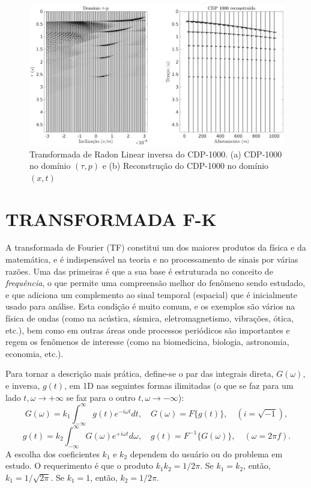 \begin{landscape}
\begin{figure}[H]
\centering
\includegraphics[totalheight=14cm]{figuras/cap2/radon_volta.pdf}
\caption{Transformada de Radon Linear inversa do CDP-1000. (a) CDP-1000 no domínio $(\tau, p)$ e (b) Reconstrução do CDP-1000 no domínio $(x, t)$ }
\label{fig:radon_volta}
\end{figure}
\end{landscape}

\section{TRANSFORMADA F-K}

A transformada de Fourier (TF) constitui um dos maiores produtos da física e da matemática, e é indispensável na teoria e no processamento de sinais por várias razões. 
Uma das primeiras é que a sua base é estruturada no conceito de \textit{frequência}, o que permite uma compreensão melhor do fenômeno sendo estudado, e que adiciona um complemento ao sinal temporal (espacial) que é inicialmente usado para análise. 
Esta condição é muito comum, e os exemplos são vários na física de ondas (como na acústica, sísmica, eletromagnetismo, vibrações, ótica, etc.), bem como em outras áreas onde processos periódicos são importantes e regem os fenômenos de interesse (como na biomedicina, biologia, astronomia, economia, etc.). \citep{Lourenildo(2015)}

Para tornar a descrição mais prática, define-se o par das integrais direta, $G(\omega)$, e inversa, $g(t)$, em 1D nas seguintes formas ilimitadas (o que se faz para um lado $t,\omega \rightarrow +\infty$ se faz para o outro $t,\omega \rightarrow -\infty$):
\begin{equation}
G(\omega)=k_{1}\int_{-\infty}^{\infty}g(t)e^{-i\omega t}dt, \quad G(\omega)=F\{g(t)\}, \quad (i=\sqrt{-1}),
\label{eq.3.1}
\end{equation}
\begin{equation}
g(t)=k_{2}\int_{-\infty}^{\infty}G(\omega)e^{+i\omega t}d\omega, \quad g(t)=F^{-1}\{G(\omega)\}, \quad (\omega=2\pi f).
\label{eq.3.2}
\end{equation}
A escolha dos coeficientes $k_{1}$ e $k_{2}$ dependem do usuário ou do problema em estudo. O requerimento é que o produto $k_{1}k_{2}=1/2\pi$. Se $k_{1}=k_{2}$, então, $k_{1}=1/\sqrt{2\pi}$. Se $k_{1}=1$, então, $k_{2}=1/2\pi$.

